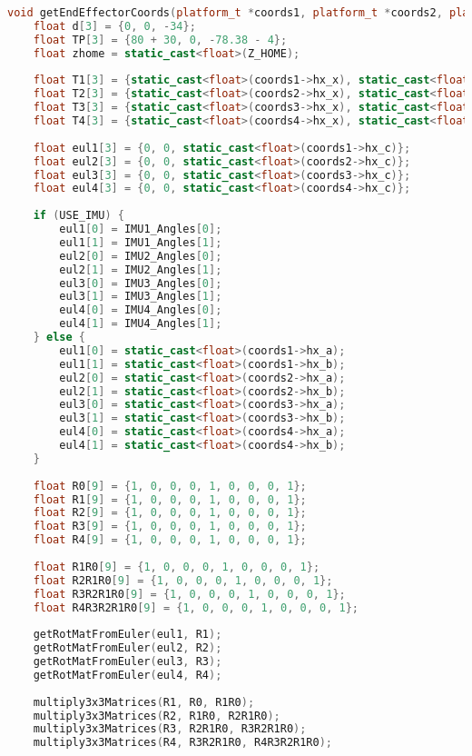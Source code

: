 \documentclass[11pt]{ucthesisCP}
\begin{document}
\begin{lstlisting}[language=C++]
void getEndEffectorCoords(platform_t *coords1, platform_t *coords2, platform_t *coords3, platform_t *coords4, bool USE_IMU){
	float d[3] = {0, 0, -34};
	float TP[3] = {80 + 30, 0, -78.38 - 4};
	float zhome = static_cast<float>(Z_HOME);
	
	float T1[3] = {static_cast<float>(coords1->hx_x), static_cast<float>(coords1->hx_y), static_cast<float>(coords1->hx_z) + zhome};
	float T2[3] = {static_cast<float>(coords2->hx_x), static_cast<float>(coords2->hx_y), static_cast<float>(coords2->hx_z) + zhome};
	float T3[3] = {static_cast<float>(coords3->hx_x), static_cast<float>(coords3->hx_y), static_cast<float>(coords3->hx_z) + zhome};
	float T4[3] = {static_cast<float>(coords4->hx_x), static_cast<float>(coords4->hx_y), static_cast<float>(coords4->hx_z) + zhome};
	
	float eul1[3] = {0, 0, static_cast<float>(coords1->hx_c)};
	float eul2[3] = {0, 0, static_cast<float>(coords2->hx_c)};
	float eul3[3] = {0, 0, static_cast<float>(coords3->hx_c)};
	float eul4[3] = {0, 0, static_cast<float>(coords4->hx_c)};
	
	if (USE_IMU) {
		eul1[0] = IMU1_Angles[0];
		eul1[1] = IMU1_Angles[1];
		eul2[0] = IMU2_Angles[0];
		eul2[1] = IMU2_Angles[1];
		eul3[0] = IMU3_Angles[0];
		eul3[1] = IMU3_Angles[1];
		eul4[0] = IMU4_Angles[0];
		eul4[1] = IMU4_Angles[1];
	} else {
		eul1[0] = static_cast<float>(coords1->hx_a);
		eul1[1] = static_cast<float>(coords1->hx_b);
		eul2[0] = static_cast<float>(coords2->hx_a);
		eul2[1] = static_cast<float>(coords2->hx_b);
		eul3[0] = static_cast<float>(coords3->hx_a);
		eul3[1] = static_cast<float>(coords3->hx_b);
		eul4[0] = static_cast<float>(coords4->hx_a);
		eul4[1] = static_cast<float>(coords4->hx_b);
	}
	
	float R0[9] = {1, 0, 0, 0, 1, 0, 0, 0, 1};
	float R1[9] = {1, 0, 0, 0, 1, 0, 0, 0, 1};
	float R2[9] = {1, 0, 0, 0, 1, 0, 0, 0, 1};
	float R3[9] = {1, 0, 0, 0, 1, 0, 0, 0, 1};
	float R4[9] = {1, 0, 0, 0, 1, 0, 0, 0, 1};
	
	float R1R0[9] = {1, 0, 0, 0, 1, 0, 0, 0, 1};
	float R2R1R0[9] = {1, 0, 0, 0, 1, 0, 0, 0, 1};
	float R3R2R1R0[9] = {1, 0, 0, 0, 1, 0, 0, 0, 1};
	float R4R3R2R1R0[9] = {1, 0, 0, 0, 1, 0, 0, 0, 1};
	
	getRotMatFromEuler(eul1, R1);
	getRotMatFromEuler(eul2, R2);
	getRotMatFromEuler(eul3, R3);
	getRotMatFromEuler(eul4, R4);
	
	multiply3x3Matrices(R1, R0, R1R0);
	multiply3x3Matrices(R2, R1R0, R2R1R0);
	multiply3x3Matrices(R3, R2R1R0, R3R2R1R0);
	multiply3x3Matrices(R4, R3R2R1R0, R4R3R2R1R0);
	

\end{lstlisting}
\end{document}
